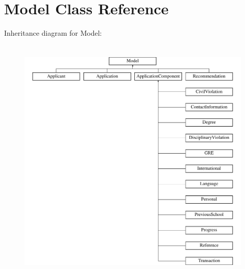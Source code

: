 \hypertarget{class_model}{\section{Model Class Reference}
\label{class_model}
}
Inheritance diagram for Model\-:\begin{figure}[H]
\begin{center}
\leavevmode
\includegraphics[height=12.000000cm]{class_model}
\end{center}
\end{figure}
